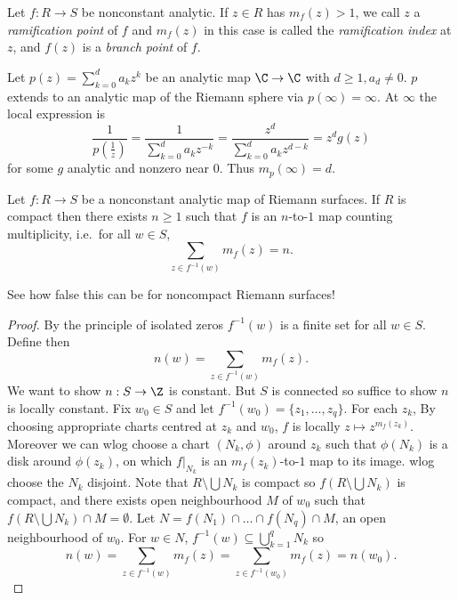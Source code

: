\documentclass[a4paper]{article}
\begin{document}
\begin{definition}
  Let \(f: R \to S\) be nonconstant analytic. If \(z \in R\) has \(m_f(z) > 1\), we call \(z\) a \emph{ramification point} of \(f\) and \(m_f(z)\) in this case is called the \emph{ramification index} at \(z\), and \(f(z)\) is a \emph{branch point} of \(f\).
\end{definition}

\begin{eg}
  Let \(p(z) = \sum_{k = 0}^d a_kz^k\) be an analytic map \(\C \to \C\) with \(d \geq 1, a_d \neq 0\). \(p\) extends to an analytic map of the Riemann sphere via \(p(\infty) = \infty\). At \(\infty\) the local expression is
  \[
    \frac{1}{p(\frac{1}{z})} = \frac{1}{\sum_{k = 0}^d a_k z^{-k}} = \frac{z^d}{\sum_{k = 0}^d a_k z^{d - k}} = z^d g(z)
  \]
  for some \(g\) analytic and nonzero near \(0\). Thus \(m_p(\infty) = d\).
\end{eg}

\begin{theorem}
  Let \(f: R \to S\) be a nonconstant analytic map of Riemann surfaces. If \(R\) is compact then there exists \(n \geq 1\) such that \(f\) is an \(n\)-to-\(1\) map counting multiplicity, i.e.\ for all \(w \in S\),
  \[
    \sum_{z \in f^{-1}(w)} m_f(z) = n.
  \]
\end{theorem}

See how false this can be for noncompact Riemann surfaces!

\begin{proof}
  By the principle of isolated zeros \(f^{-1}(w)\) is a finite set for all \(w \in S\). Define then
  \[
    n(w) = \sum_{z \in f^{-1}(w)} m_f(z).
  \]
  We want to show \(n: S \to \Z\) is constant. But \(S\) is connected so suffice to show \(n\) is locally constant. Fix \(w_0 \in S\) and let \(f^{-1}(w_0) = \{z_1, \dots, z_q\}\). For each \(z_k\), By choosing appropriate charts centred at \(z_k\) and \(w_0\), \(f\) is locally \(z \mapsto z^{m_f(z_k)}\). Moreover we can wlog choose a chart \((N_k, \phi)\) around \(z_k\) such that \(\phi(N_k)\) is a disk around \(\phi(z_k)\), on which \(f|_{N_k}\) is an \(m_f(z_k)\)-to-\(1\) map to its image. wlog choose the \(N_k\) disjoint. Note that \(R \setminus \bigcup N_k\) is compact so \(f(R \setminus \bigcup N_k)\) is compact, and there exists open neighbourhood \(M\) of \(w_0\) such that \(f(R \setminus \bigcup N_k) \cap M = \emptyset\). Let \(N = f(N_1) \cap \dots \cap f(N_q) \cap M\), an open neighbourhood of \(w_0\). For \(w \in N\), \(f^{-1}(w) \subseteq \bigcup_{k = 1}^q N_k\) so
  \[
    n(w) = \sum_{z \in f^{-1}(w)} m_f(z) = \sum_{z \in f^{-1}(w_0)} m_f(z) = n(w_0).
  \]
\end{proof}
\end{document}
